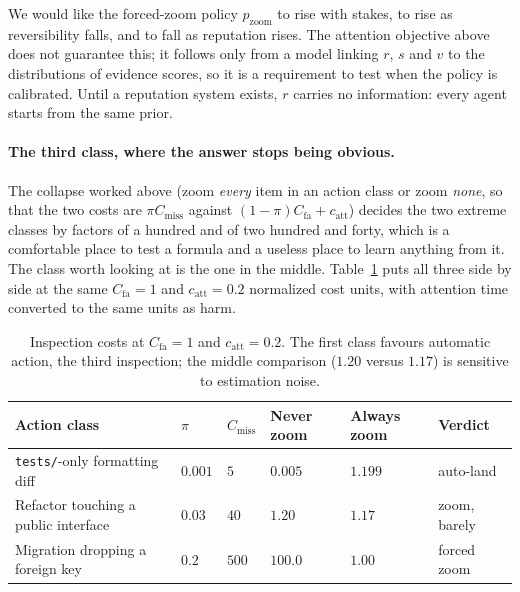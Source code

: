 \documentclass[11pt,a4paper]{article}
\theoremstyle{definition}
\theoremstyle{plain}
\begin{document}
We would like the forced-zoom policy $p_{\mathrm{zoom}}$ to rise
with stakes, to rise as reversibility falls, and to fall as reputation rises.
The attention objective above does not guarantee this; it follows only from a
model linking $r$, $s$ and $v$ to the distributions of evidence scores, so it
is a requirement to test when the policy is calibrated. Until a reputation
system exists, $r$ carries no information: every agent starts from the same
prior.

\paragraph{The third class, where the answer stops being obvious.} The collapse
worked above (zoom \emph{every} item in an action class or zoom \emph{none}, so
that the two costs are $\pi C_{\text{miss}}$ against
$(1-\pi)C_{\text{fa}} + c_{\mathrm{att}}$) decides the two extreme classes by
factors of a hundred and of two hundred and forty, which is a comfortable place to
test a formula and a useless place to learn anything from it. The class worth
looking at is the one in the middle. Table~\ref{tab:sdt-numbers} puts all three
side by side at the same $C_{\text{fa}}=1$ and $c_{\mathrm{att}}=0.2$
normalized cost units, with attention time converted to the same units as harm.

\begin{table}[H]
\centering
\small
\renewcommand{\arraystretch}{1.25}
\setlength{\tabcolsep}{2pt}
\begin{tabularx}{\textwidth}{@{}>{\raggedright\arraybackslash}X >{\centering\arraybackslash}p{} >{\centering\arraybackslash}p{} >{\centering\arraybackslash}p{} >{\centering\arraybackslash}p{} >{\raggedright\arraybackslash}p{}@{}}
\toprule
\textbf{Action class} & $\pi$ & $C_{\text{miss}}$ & \textbf{Never zoom} & \textbf{Always zoom} & \textbf{Verdict} \\
\midrule
\texttt{tests/}-only formatting diff & $0.001$ & $5$ & $0.005$ & $1.199$ & auto-land \\
Refactor touching a public interface & $0.03$ & $40$ & $1.20$ & $1.17$ & zoom, barely \\
Migration dropping a foreign key & $0.2$ & $500$ & $100.0$ & $1.00$ & forced zoom \\
\bottomrule
\end{tabularx}
\caption{Inspection costs at $C_{\mathrm{fa}}=1$ and $c_{\mathrm{att}}=0.2$. The first class favours automatic action, the third inspection; the middle comparison ($1.20$ versus $1.17$) is sensitive to estimation noise.}
\label{tab:sdt-numbers}
\end{table}
\end{document}

